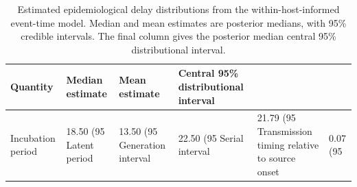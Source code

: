 \begin{table}[ht]
\centering
\caption{Estimated epidemiological delay distributions from the within-host-informed event-time model. Median and mean estimates are posterior medians, with 95\% credible intervals. The final column gives the posterior median central 95\% distributional interval.}
\begin{tabular}{llll}
\hline
Quantity & Median estimate & Mean estimate & Central 95\% distributional interval \\
\hline
Incubation period & 18.50 (95%
Latent period & 13.50 (95%
Generation interval & 22.50 (95%
Serial interval & 21.79 (95%
Transmission timing relative to source onset & 0.07 (95%
\hline
\end{tabular}
\end{table}

